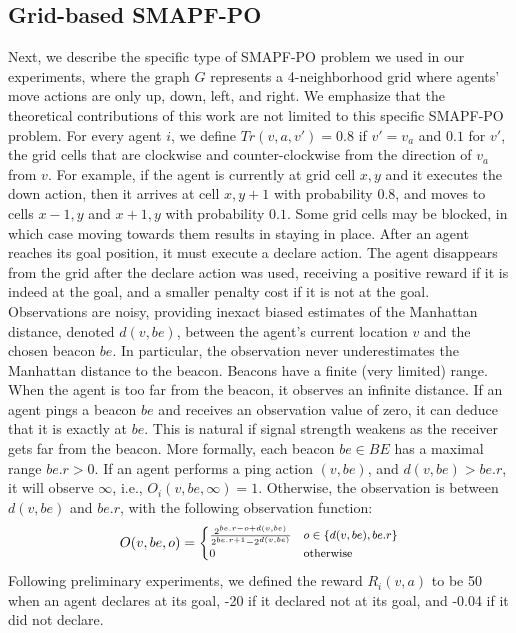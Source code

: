 \documentclass[letterpaper]{article} %
\begin{document}
\subsection{Grid-based SMAPF-PO}
Next, we describe the specific type of SMAPF-PO problem we used in our experiments, where the graph $G$ represents a 4-neighborhood grid where agents' move actions are only up, down, left, and right. We emphasize that the theoretical contributions of this work are not limited to this specific SMAPF-PO problem.
For every agent $i$, we define $Tr(v,a,v')=0.8$ if $v'=v_a$ and $0.1$ for $v'$, the grid cells that are clockwise and counter-clockwise from the direction of $v_a$ from $v$.
For example, if the agent is currently at grid cell $x,y$ and it executes the down action, then it arrives at cell $x,y+1$ with probability $0.8$, and moves to cells $x-1,y$ and $x+1,y$ with probability $0.1$.
Some grid cells may be blocked, in which case moving towards them results in staying in place.
After an agent reaches its goal position, it must execute a declare action. The agent disappears from the grid after the declare action was used, receiving a positive reward if it is indeed at the goal, and a smaller penalty cost if it is not at the goal.
Observations are noisy, providing inexact biased estimates of the Manhattan distance, denoted $d(v,be)$, between the agent's current location $v$ and the chosen beacon $be$. %
In particular, the observation never underestimates the Manhattan distance to the beacon. Beacons have a finite (very limited) range. When the agent is too far from the beacon, it observes an infinite distance.
If an agent pings a beacon $be$ and receives an observation value of zero, it can deduce that it is exactly  at $be$. This is natural if signal strength weakens as the receiver gets far from the beacon.
More formally, each beacon $be\in BE$ has a maximal range $be.r>0$.
If an agent performs a ping action $(v,be)$, and $d(v,be)>be.r$, it will observe $\infty$, i.e., $O_i(v,be,\infty)=1$.
Otherwise, the observation is between $d(v, be)$ and $be.r$, with the following observation function:
\begin{equation}
\footnotesize
    O(v,be,o) =
    \begin{cases}
        \frac{2^{be.r-o+d(v,be)}}{2^{be.r+1}-2^{d(v,be)}} & o\in\{d(v,be), be.r\} \\
        0 & \text{otherwise}
    \end{cases}
\end{equation}
Following preliminary experiments, we defined the reward $R_i(v,a)$ to be 50 when an agent declares at its goal, -20 if it declared not at its goal, and -0.04 if it did not declare.
\end{document}
